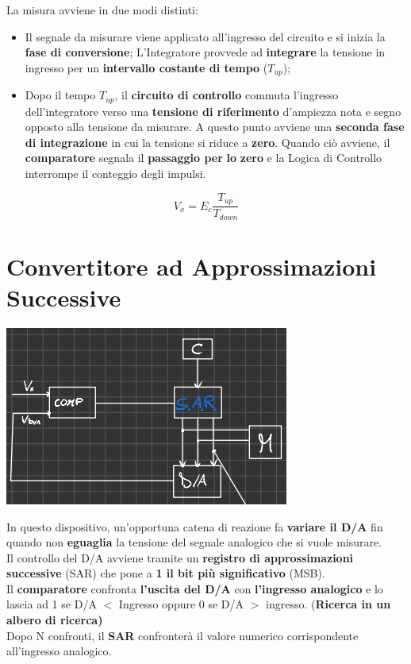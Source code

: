 La misura avviene in due modi distinti:
\begin{itemize}
    \item Il segnale da misurare viene applicato all'ingresso del circuito e si inizia la \textbf{fase di conversione}; L'Integratore provvede ad \textbf{integrare} la tensione in ingresso per un \textbf{intervallo costante di tempo} ($T_{up}$);
    \item Dopo il tempo $T_{up}$, il \textbf{circuito di controllo} commuta l'ingresso dell'integratore verso una \textbf{tensione di riferimento} d'ampiezza nota e segno opposto alla tensione da misurare. A questo punto avviene una \textbf{seconda fase di integrazione} in cui la tensione si riduce a \textbf{zero}. Quando ciò avviene, il \textbf{comparatore} segnala il \textbf{passaggio per} \textbf{lo} \textbf{zero} e la Logica di Controllo interrompe il conteggio degli impulsi.
\end{itemize}
\begin{equation*}
    V_x = E_c \frac{T_{up}}{T_{down}}
\end{equation*}
\section{Convertitore ad Approssimazioni Successive}
\begin{center}
    \includegraphics[width=.4\textwidth]{Images/figure42.png}
\end{center}
In questo dispositivo, un'opportuna catena di reazione fa \textbf{variare il D/A} fin quando non \textbf{eguaglia} la tensione del segnale analogico che si vuole misurare.\\
Il controllo del D/A avviene tramite un \textbf{registro di approssimazioni successive} (SAR) che pone a \textbf{1 il bit più significativo} (MSB).\\
Il \textbf{comparatore} confronta \textbf{l'uscita del D/A} con \textbf{l'ingresso analogico} e lo lascia ad 1 se D/A $<$ Ingresso oppure 0 se D/A $>$ ingresso. (\textbf{Ricerca in un albero di ricerca)}\\
Dopo N confronti, il \textbf{SAR} confronterà il valore numerico corrispondente all'ingresso analogico.
